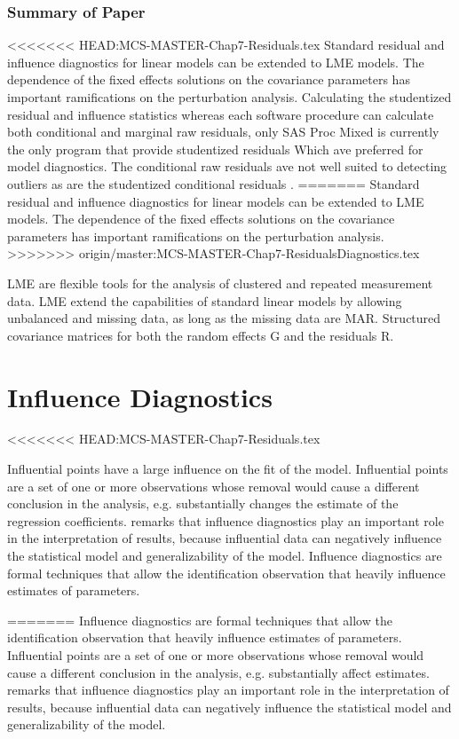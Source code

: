 \documentclass[12pt, a4paper]{report}
\theoremstyle{plain}
\theoremstyle{definition}
\theoremstyle{remark}
\begin{document}
\subsubsection{Summary of Paper}
<<<<<<< HEAD:MCS-MASTER-Chap7-Residuals.tex
Standard residual and influence diagnostics for linear models can be extended to LME models. The dependence of the fixed effects solutions on the covariance parameters has important ramifications on the perturbation analysis. Calculating the studentized residual and influence statistics whereas each software procedure can calculate both conditional and marginal raw residuals, only SAS Proc Mixed is currently the only program that provide studentized residuals Which ave preferred for model diagnostics. The conditional raw residuals ave not well suited to detecting outliers as are the studentized conditional residuals \citep{schabenberger}.
=======
Standard residual and influence diagnostics for linear models can be extended to LME models. The dependence of the fixed effects solutions on the covariance parameters has important ramifications on the perturbation analysis. 
>>>>>>> origin/master:MCS-MASTER-Chap7-ResidualsDiagnostics.tex

LME are flexible tools for the analysis of clustered and repeated measurement data. LME extend the capabilities of standard linear models by allowing unbalanced and missing data, as long as the missing data are MAR. Structured covariance matrices for both the random effects G and the residuals R. 


\section{Influence Diagnostics}

	
<<<<<<< HEAD:MCS-MASTER-Chap7-Residuals.tex

	
Influential points have a large influence on the fit of the model. Influential points are a set of one or more observations whose removal would cause a different conclusion in the analysis, e.g. substantially changes the estimate of the regression coefficients. \citet{west} remarks that influence diagnostics play an important role in the interpretation of results, because influential data can negatively influence the statistical model and generalizability of the model. Influence diagnostics are formal techniques that allow the identification observation that heavily influence estimates of parameters.


=======
Influence diagnostics are formal techniques that allow the identification observation that heavily influence estimates of parameters.
Influential points are a set of one or more observations whose removal would cause a different conclusion in the analysis, e.g. substantially affect estimates. \citet{west} remarks that influence diagnostics play an important role in the interpretation of results, because influential data can negatively influence the statistical model and generalizability of the model.
\end{document}

